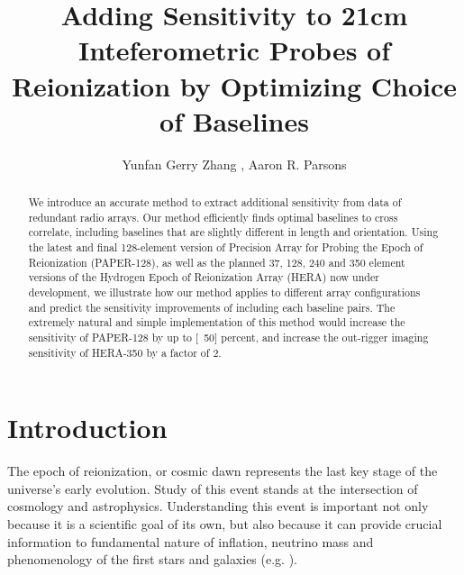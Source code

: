 \documentclass[preprint2,numberedappendix,tighten,twocolappendix]{aastex6}  %
\renewcommand\[{\begin{equation}}
\renewcommand\]{\end{equation}}
\begin{document}
\title{Adding Sensitivity to 21cm Inteferometric Probes of Reionization by Optimizing Choice of Baselines}

\author{
Yunfan Gerry Zhang ,
Aaron R. Parsons
}


\begin{abstract}
We introduce an accurate method to extract additional sensitivity from data of redundant radio arrays. Our method efficiently finds optimal baselines to cross correlate, including baselines that are slightly different in length and orientation. 
Using the latest and final 128-element version of Precision Array for Probing the Epoch of Reionization (PAPER-128), as well as the planned 37, 128, 240 and 350 element versions of the Hydrogen Epoch of Reionization Array (HERA) now under development, we illustrate how our method applies to different array configurations and predict the sensitivity improvements of including each baseline pairs. The extremely natural and simple implementation of this method
would increase the sensitivity of PAPER-128 by up to [~50] percent, and increase the out-rigger imaging sensitivity of HERA-350 by a factor of 2. 
\end{abstract}

\section{Introduction}

The epoch of reionization, or cosmic dawn represents the last key
stage of the universe's early evolution. Study of this event stands at
the intersection of cosmology and astrophysics. Understanding this
event is important not only because it is a scientific goal
of its own, but also because it can provide crucial information
to fundamental nature of inflation, neutrino mass and phenomenology
of the first stars and galaxies (e.g. \cite{LiuOpticalDepth}). 
\end{document}
